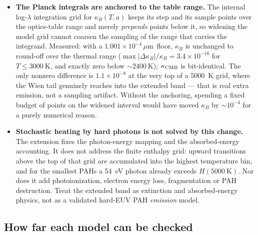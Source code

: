\documentclass{my_memo}
\newcommand{\um}{\ensuremath{\,\mu\mathrm{m}}}
\begin{document}
\begin{itemize}
\item \textbf{The Planck integrals are anchored to the table range.} The
      internal log-$\lambda$ integration grid for $\kappa_B(T,a)$ keeps its step
      and its sample points over the optics-table range and merely
      \emph{prepends} points below it, so widening the model grid cannot
      coarsen the sampling of the range that carries the integrand. Measured:
      with a $1.001\times10^{-4}$\um\ floor, $\kappa_B$ is unchanged to
      round-off over the thermal range ($\max|\Delta\kappa_B|/\kappa_B =
      3.4\times10^{-16}$ for $T\le\SI{3000}{\kelvin}$, and exactly zero below
      $\sim\SI{2400}{\kelvin}$); $\kappa_{\rm CMB}$ is bit-identical. The only
      nonzero difference is $1.1\times10^{-8}$ at the very top of a
      \SI{5000}{\kelvin} grid, where the Wien tail genuinely reaches into the
      extended band --- that is real extra emission, not a sampling artifact.
      Without the anchoring, spending a fixed budget of points on the widened
      interval would have moved $\kappa_B$ by $\sim10^{-4}$ for a purely
      numerical reason.
\item \textbf{Stochastic heating by hard photons is not solved by this change.}
      The extension fixes the photon-energy mapping and the absorbed-energy
      accounting. It does not address the finite enthalpy grid: upward
      transitions above the top of that grid are accumulated into the highest
      temperature bin, and for the smallest PAHs a \SI{54}{\electronvolt}
      photon already exceeds $H(\SI{5000}{\kelvin})$. Nor does it add
      photoionization, electron energy loss, fragmentation or PAH destruction.
      Treat the extended band as extinction and absorbed-energy physics, not as
      a validated hard-EUV PAH \emph{emission} model.
\end{itemize}

\subsection{How far each model can be checked}\label{sec:euv-refs}
\end{document}
